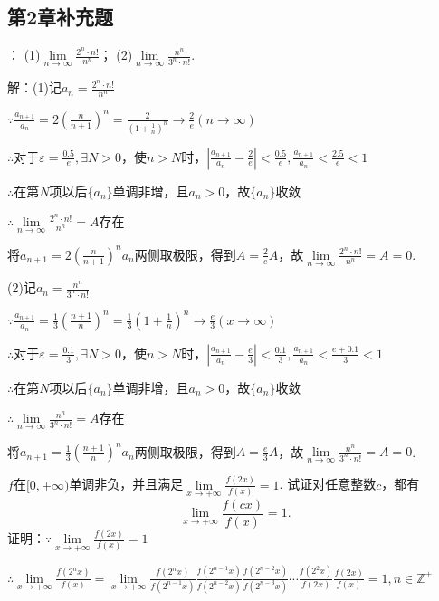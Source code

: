 \documentclass[12pt,UTF8]{ctexart}
\begin{document}
\subsection{第2章补充题}
\begin{enumerate}
：
\newline
(1)$\lim\limits_{n\rightarrow\infty}\frac{2^n\cdot n!}{n^n}$；
\newline
(2)$\lim\limits_{n\rightarrow\infty}\frac{n^n}{3^n\cdot n!}$.

解：(1)记$a_n=\frac{2^n\cdot n!}{n^n}$

$\because\frac{a_{n+1}}{a_n}=2(\frac{n}{n+1})^n=\frac2{(1+\frac1n)^n}\rightarrow\frac2e(n\rightarrow\infty)$

$\therefore$对于$\varepsilon=\frac{0.5}e,\exists N>0$，使$n>N$时，$|\frac{a_{n+1}}{a_n}-\frac{2}e|<\frac{0.5}e,\frac{a_{n+1}}{a_n}<\frac{2.5}e<1$

$\therefore$在第$N$项以后$\{a_n\}$单调非增，且$a_n>0$，故$\{a_n\}$收敛

$\therefore\lim\limits_{n\rightarrow\infty}\frac{2^n\cdot n!}{n^n}=A$存在

将$a_{n+1}=2(\frac{n}{n+1})^na_n$两侧取极限，得到$A=\frac2eA$，故$\lim\limits_{n\rightarrow\infty}\frac{2^n\cdot n!}{n^n}=A=0$.

(2)记$a_{n}=\frac{n^n}{3^n\cdot n!}$

$\because\frac{a_{n+1}}{a_n}=\frac13(\frac{n+1}n)^n=\frac13(1+\frac{1}n)^n\rightarrow\frac e3(x\rightarrow\infty)$

$\therefore$对于$\varepsilon=\frac{0.1}3,\exists N>0$，使$n>N$时，$|\frac{a_{n+1}}{a_n}-\frac{e}3|<\frac{0.1}3,\frac{a_{n+1}}{a_n}<\frac{e+0.1}3<1$

$\therefore$在第$N$项以后$\{a_n\}$单调非增，且$a_n>0$，故$\{a_n\}$收敛

$\therefore\lim\limits_{n\rightarrow\infty}\frac{n^n}{3^n\cdot n!}=A$存在

将$a_{n+1}=\frac13(\frac{n+1}n)^na_n$两侧取极限，得到$A=\frac e3A$，故$\lim\limits_{n\rightarrow\infty}\frac{n^n}{3^n\cdot n!}=A=0$.

$f$在$[0,+\infty)$单调非负，并且满足$\lim\limits_{x\rightarrow+\infty}\frac{f(2x)}{f(x)}=1$. 试证对任意整数$c$，都有
\[
\lim\limits_{x\rightarrow+\infty}\frac{f(cx)}{f(x)}=1.
\]
证明：$\because\lim\limits_{x\rightarrow+\infty}\frac{f(2x)}{f(x)}=1$

$\therefore\lim\limits_{x\rightarrow+\infty}\frac{f(2^nx)}{f(x)}=\lim\limits_{x\rightarrow+\infty}\frac{f(2^nx)}{f(2^{n-1}x)}\frac{f(2^{n-1}x)}{f(2^{n-2}x)}\frac{f(2^{n-2}x)}{f(2^{n-3}x)}\cdots\frac{f(2^2x)}{f(2x)}\frac{f(2x)}{f(x)}=1,n\in\mathbb Z^+$


\end{enumerate}
\end{document}

